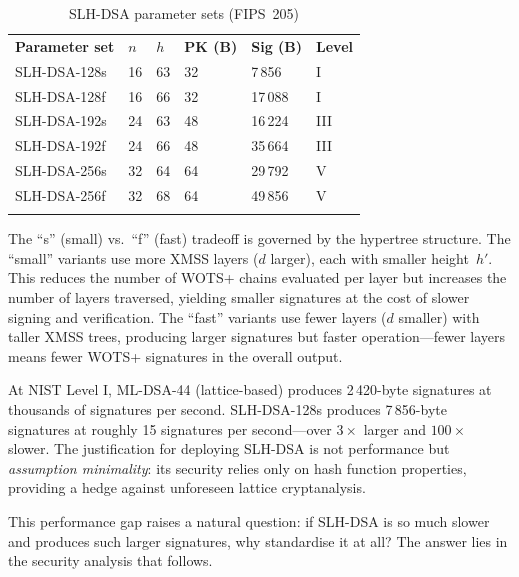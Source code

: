 \begin{table}[t]
\caption{SLH-DSA parameter sets (FIPS~205)}
\label{tab:slh-params}
\begin{tabular}{p{3.2cm}p{1.2cm}p{1.2cm}p{1.5cm}p{1.5cm}p{1.5cm}}
\hline\noalign{\smallskip}
\textbf{Parameter set} & \textbf{$n$} & \textbf{$h$} & \textbf{PK (B)} & \textbf{Sig (B)} & \textbf{Level} \\
\noalign{\smallskip}\svhline\noalign{\smallskip}
SLH-DSA-128s & 16 & 63 & 32 & 7\,856  & I \\
SLH-DSA-128f & 16 & 66 & 32 & 17\,088 & I \\
SLH-DSA-192s & 24 & 63 & 48 & 16\,224 & III \\
SLH-DSA-192f & 24 & 66 & 48 & 35\,664 & III \\
SLH-DSA-256s & 32 & 64 & 64 & 29\,792 & V \\
SLH-DSA-256f & 32 & 68 & 64 & 49\,856 & V \\
\noalign{\smallskip}\hline
\end{tabular}
\end{table}

The ``s'' (small) vs.\ ``f'' (fast) tradeoff is governed by the hypertree structure.  The ``small'' variants use more XMSS layers ($d$ larger), each with smaller height~$h'$.  This reduces the number of WOTS+ chains evaluated per layer but increases the number of layers traversed, yielding smaller signatures at the cost of slower signing and verification.  The ``fast'' variants use fewer layers ($d$ smaller) with taller XMSS trees, producing larger signatures but faster operation---fewer layers means fewer WOTS+ signatures in the overall output.

\begin{example}
\label{ex:slh-vs-ml}
At NIST Level I, ML-DSA-44 (lattice-based) produces 2\,420-byte signatures at thousands of signatures per second.  SLH-DSA-128s produces 7\,856-byte signatures at roughly 15 signatures per second---over $3\times$ larger and $100\times$ slower.  The justification for deploying SLH-DSA is not performance but \emph{assumption minimality}: its security relies only on hash function properties, providing a hedge against unforeseen lattice cryptanalysis.
\end{example}

This performance gap raises a natural question: if SLH-DSA is so much slower and produces such larger signatures, why standardise it at all?  The answer lies in the security analysis that follows.


